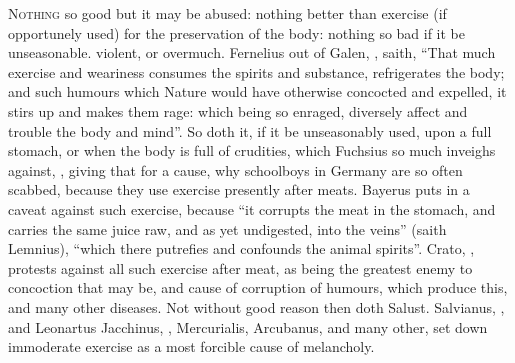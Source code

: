 \lettrine{N}{othing} so good but it may be abused: nothing better than exercise
(if opportunely used) for the preservation of the body: nothing so bad if it be
unseasonable. violent, or overmuch. Fernelius out of Galen,
, saith, \enquote{That
much exercise and weariness consumes the spirits and substance, refrigerates
the body; and such humours which Nature would have otherwise concocted and
expelled, it stirs up and makes them rage: which being so enraged, diversely
affect and trouble the body and mind}. So doth it, if it be unseasonably used,
upon a full stomach, or when the body is full of crudities, which Fuchsius so
much inveighs against, ,
giving that for a cause, why schoolboys in Germany are so often scabbed,
because they use exercise presently after meats. Bayerus
puts in a caveat against such exercise, because \enquote{it
corrupts the meat in the stomach, and carries the same
juice raw, and as yet undigested, into the veins} (saith Lemnius), \enquote{which there
putrefies and confounds the animal spirits}. Crato,
, protests against
all such exercise after meat, as being the greatest enemy to concoction that
may be, and cause of corruption of humours, which produce this, and many other
diseases. Not without good reason then doth Salust. Salvianus,
, and Leonartus Jacchinus,
, Mercurialis, Arcubanus, and many other,
set down immoderate exercise as a most forcible cause of
melancholy.

